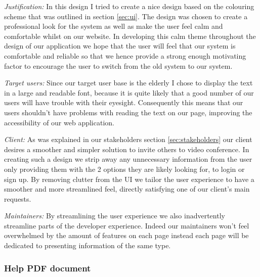 \textit{Justification:}
In this design I tried to create a nice design based on
the colouring scheme that was outlined in section \ref{sec:ui}.
The design was chosen to create a professional look for the
system as well as make the user feel calm and comfortable
whilst on our website. In developing this calm theme
throughout the design of our application we hope that
the user will feel that our system is comfortable and
reliable so that we hence provide a strong enough
motivating factor to encourage the user to switch from
the old system to our system.\\ \vspace{0.2cm}

\textit{Target users:}
Since our target user base is the elderly I chose to display
the text in a large and readable font, because it is quite
likely that a good number of our users will have trouble
with their eyesight. Consequently this means that our
users shouldn't have problems with reading the text on our
page, improving the accessibility of our web application.
\\ \vspace{0.2cm}

\textit{Client:}
As was explained in our stakeholders section \ref{sec:stakeholders}
our client desires a smoother and simpler solution to
invite others to video conference. In creating such a design
we strip away any unnecessary information from the user
only providing them with the 2 options they are likely
looking for, to login or sign up. By removing clutter
from the UI we tailor the user experience to have a
smoother and more streamlined feel, directly satisfying one
of our client's main requests.
\\ \vspace{0.2cm}

\textit{Maintainers:} By streamlining the user experience
we also inadvertently streamline parts of the developer
experience. Indeed our maintainers won't feel overwhelmed by
the amount of features on each page instead each page will be
dedicated to presenting information of the same type.
\\ \vspace{0.2cm}

\subsubsection{Help PDF document}

